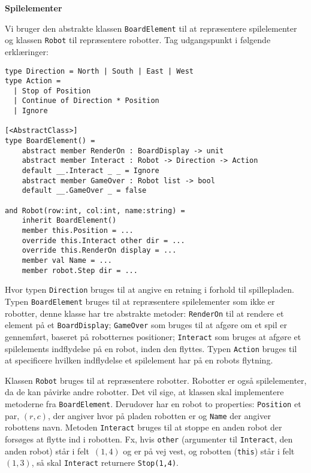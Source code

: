 \textbf{Spilelementer}

Vi bruger den abstrakte klassen \lstinline{BoardElement} til at
repræsentere spilelementer og klassen \lstinline{Robot} til
repræsentere robotter. Tag udgangspunkt i følgende
erklæringer:

\begin{lstlisting}
type Direction = North | South | East | West
type Action =
  | Stop of Position
  | Continue of Direction * Position
  | Ignore

[<AbstractClass>]
type BoardElement() =
    abstract member RenderOn : BoardDisplay -> unit
    abstract member Interact : Robot -> Direction -> Action
    default __.Interact _ _ = Ignore
    abstract member GameOver : Robot list -> bool
    default __.GameOver _ = false

and Robot(row:int, col:int, name:string) =
    inherit BoardElement()
    member this.Position = ...
    override this.Interact other dir = ...
    override this.RenderOn display = ...
    member val Name = ...
    member robot.Step dir = ...
\end{lstlisting}

Hvor typen \lstinline{Direction} bruges til at angive en retning i
forhold til spillepladen. Typen \lstinline{BoardElement} bruges til at
repræsentere spilelementer som ikke er robotter, denne klasse har tre
abstrakte metoder: \lstinline{RenderOn} til at rendere et element på
et \lstinline{BoardDisplay}; \lstinline{GameOver} som bruges til at
afgøre om et spil er gennemført, baseret på robotternes positioner;
\lstinline{Interact} som bruges at afgøre et spilelements indflydelse
på en robot, inden den flyttes. Typen \lstinline{Action} bruges til at
specificere hvilken indflydelse et spilelement har på en robots
flytning.

Klassen \lstinline{Robot} bruges til at repræsentere
robotter. Robotter er også spilelementer, da de kan påvirke andre
robotter. Det vil sige, at klassen skal implementere metoderne fra
\lstinline{BoardElement}. Derudover har en robot to properties:
\lstinline{Position} et par, $(r,c)$, der angiver hvor
på pladen robotten er og \lstinline{Name} der angiver robottens
navn. Metoden \lstinline{Interact} bruges til at stoppe en anden robot
der forsøges at flytte ind i robotten. Fx, hvis \lstinline{other}
(argumenter til \lstinline{Interact}, den anden robot) står i
felt~$(1,4)$ og er på vej vest, og robotten (\lstinline{this}) står i
felt~$(1,3)$, så skal \lstinline{Interact} returnere \lstinline{Stop(1,4)}.

